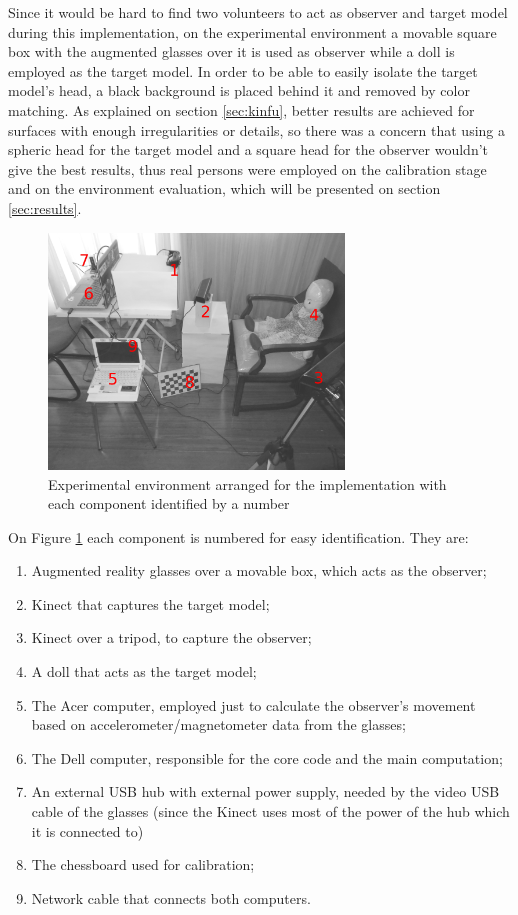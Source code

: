\documentclass[msc, a4paper, classic, en]{ufbathesis}
\begin{document}
Since it would be hard to find two volunteers to act as observer and target model during this implementation, on the experimental environment a movable square box with the augmented glasses over it is used as observer while a doll is employed as the target model. In order to be able to easily isolate the target model's head, a black background is placed behind it and removed by color matching. As explained on section \ref{sec:kinfu}, better results are achieved for surfaces with enough irregularities or details, so there was a concern that using a spheric head for the target model and a square head for the observer wouldn't give the best results, thus real persons were employed on the calibration stage and on the environment evaluation, which will be presented on section \ref{sec:results}.

\begin{figure}
\centering
\includegraphics[width=0.7\textwidth]{images/expenv2.jpg}
\caption{Experimental environment arranged for the implementation with each component identified by a number}
\label{fig:expenv2}
\end{figure}

On Figure \ref{fig:expenv2} each component is numbered for easy identification. They are:

\begin{enumerate}
  \item Augmented reality glasses over a movable box, which acts as the observer;
  \item Kinect that captures the target model;
  \item Kinect over a tripod, to capture the observer;
  \item A doll that acts as the target model;
  \item The Acer computer, employed just to calculate the observer's movement based on accelerometer/magnetometer data from the glasses;
  \item The Dell computer, responsible for the core code and the main computation;
  \item An external USB hub with external power supply, needed by the video USB cable of the glasses (since the Kinect uses most of the power of the hub which it is connected to)
  \item The chessboard used for calibration;
  \item Network cable that connects both computers.
\end{enumerate}
\end{document}
